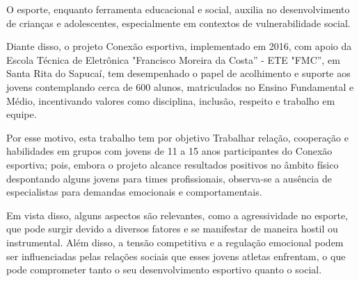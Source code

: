 \begin{Introducao} %
O esporte, enquanto ferramenta educacional e social, auxilia no desenvolvimento de crianças e adolescentes, especialmente em contextos de vulnerabilidade social. 

Diante disso, o projeto Conexão esportiva, implementado em 2016, com apoio da Escola Técnica de Eletrônica "Francisco Moreira da Costa” - ETE "FMC”, em Santa Rita do Sapucaí, tem desempenhado o papel de acolhimento e suporte aos jovens contemplando cerca de 600 alunos, matriculados no Ensino Fundamental e Médio, incentivando valores como disciplina, inclusão, respeito e trabalho em equipe.

Por esse motivo, esta trabalho tem por objetivo Trabalhar relação, cooperação e habilidades em grupos com jovens de 11 a 15 anos participantes do Conexão esportiva; pois, embora o projeto alcance resultados positivos no âmbito físico despontando alguns jovens para times profissionais, observa-se a ausência de especialistas para demandas emocionais e comportamentais.

Em vista disso, alguns aspectos são relevantes, como a agressividade no esporte, que pode surgir devido a diversos fatores e se manifestar de maneira hostil ou instrumental. Além disso, a tensão competitiva e a regulação emocional podem ser influenciadas pelas relações sociais que esses jovens atletas enfrentam, o que pode comprometer tanto o seu desenvolvimento esportivo quanto o social.
\end{Introducao}